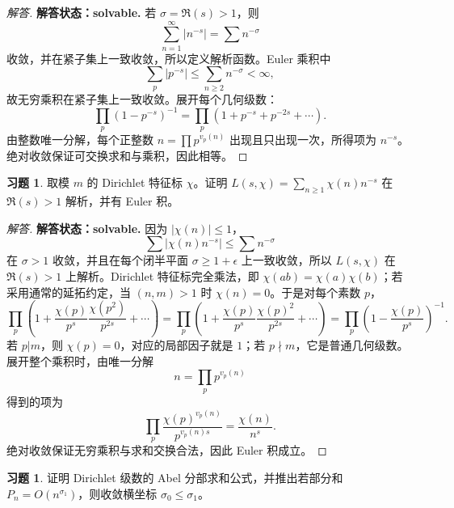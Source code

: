 \documentclass[11pt,a4paper,openany]{ctexbook}
\numberwithin{equation}{chapter}
\theoremstyle{plain}
\theoremstyle{definition}
\newtheorem{exercise}[theorem]{习题}
\theoremstyle{remark}
\begin{document}
\begin{proof}[解答]
\textbf{解答状态：solvable.}
若 $\sigma=\Re(s)>1$，则
\[
\sum_{n=1}^\infty |n^{-s}|=\sum n^{-\sigma}
\]
收敛，并在紧子集上一致收敛，所以定义解析函数。Euler 乘积中
\[
\sum_p |p^{-s}|\le \sum_{n\ge2}n^{-\sigma}<\infty,
\]
故无穷乘积在紧子集上一致收敛。展开每个几何级数：
\[
\prod_p(1-p^{-s})^{-1}
=\prod_p(1+p^{-s}+p^{-2s}+\cdots).
\]
由整数唯一分解，每个正整数 $n=\prod p^{v_p(n)}$ 出现且只出现一次，所得项为 $n^{-s}$。绝对收敛保证可交换求和与乘积，因此相等。
\end{proof}

\begin{exercise}
取模 $m$ 的 Dirichlet 特征标 $\chi$。证明 $L(s,\chi)=\sum_{n\ge1}\chi(n)n^{-s}$ 在 $\Re(s)>1$ 解析，并有 Euler 积。
\end{exercise}

\begin{proof}[解答]
\textbf{解答状态：solvable.}
因为 $|\chi(n)|\le1$，
\[
\sum|\chi(n)n^{-s}|\le\sum n^{-\sigma}
\]
在 $\sigma>1$ 收敛，并且在每个闭半平面 $\sigma\ge1+\epsilon$ 上一致收敛，所以
$L(s,\chi)$ 在 $\Re(s)>1$ 上解析。Dirichlet 特征标完全乘法，即
$\chi(ab)=\chi(a)\chi(b)$；若采用通常的延拓约定，当 $(n,m)>1$ 时
$\chi(n)=0$。于是对每个素数 $p$，
\[
\prod_p\left(1+\frac{\chi(p)}{p^s}
\frac{\chi(p^2)}{p^{2s}}+\cdots\right)
=
\prod_p\left(1+\frac{\chi(p)}{p^s}
\frac{\chi(p)^2}{p^{2s}}+\cdots\right)
=\prod_p\left(1-\frac{\chi(p)}{p^s}\right)^{-1}.
\]
若 $p|m$，则 $\chi(p)=0$，对应的局部因子就是 $1$；若 $p\nmid m$，它是普通几何级数。展开整个乘积时，由唯一分解
\[
n=\prod_p p^{v_p(n)}
\]
得到的项为
\[
\prod_p \frac{\chi(p)^{v_p(n)}}{p^{v_p(n)s}}
=\frac{\chi(n)}{n^s}.
\]
绝对收敛保证无穷乘积与求和交换合法，因此 Euler 积成立。
\end{proof}

\begin{exercise}
证明 Dirichlet 级数的 Abel 分部求和公式，并推出若部分和 $P_n=O(n^{\sigma_1})$，则收敛横坐标 $\sigma_0\le\sigma_1$。
\end{exercise}
\end{document}
